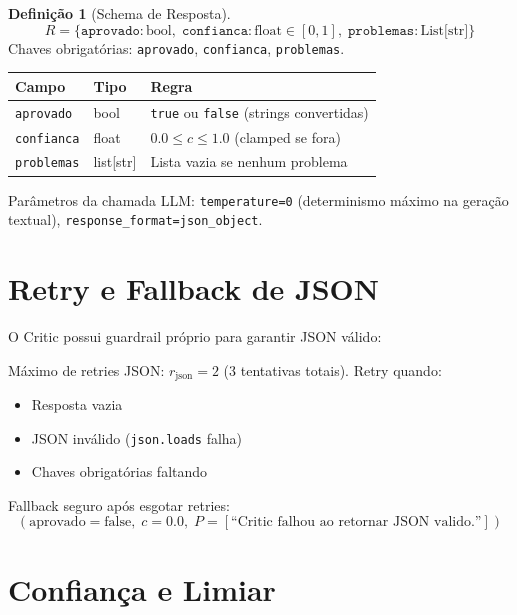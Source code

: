 \documentclass[a4paper, 12pt]{report}
\theoremstyle{definition}
\newtheorem{definicao}{Defini\c{c}\~ao}[chapter]
\theoremstyle{remark}
\begin{document}
\begin{definicao}[Schema de Resposta]
  \[
    R = \{
      \texttt{aprovado}: \text{bool},\;
      \texttt{confianca}: \text{float} \in [0, 1],\;
      \texttt{problemas}: \text{List[str]}
    \}
  \]
  Chaves obrigat\'orias: \texttt{aprovado}, \texttt{confianca}, \texttt{problemas}.
\end{definicao}

\begin{center}
\begin{tabular}{lll}
  \toprule
  \textbf{Campo} & \textbf{Tipo} & \textbf{Regra} \\
  \midrule
  \texttt{aprovado} & bool & \texttt{true} ou \texttt{false} (strings convertidas) \\
  \texttt{confianca} & float & $0.0 \leq c \leq 1.0$ (clamped se fora) \\
  \texttt{problemas} & list[str] & Lista vazia se nenhum problema \\
  \bottomrule
\end{tabular}
\end{center}

Par\^ametros da chamada LLM: \texttt{temperature=0} (determinismo m\'aximo
na gera\c{c}\~ao textual), \texttt{response\_format=json\_object}.


\section{Retry e Fallback de JSON}

O Critic possui guardrail pr\'oprio para garantir JSON v\'alido:

\begin{caixaguardrail}
  M\'aximo de retries JSON: $r_{\text{json}} = 2$ (3 tentativas totais).
  Retry quando:
  \begin{itemize}
    \item Resposta vazia
    \item JSON inv\'alido (\texttt{json.loads} falha)
    \item Chaves obrigat\'orias faltando
  \end{itemize}
  Fallback seguro ap\'os esgotar retries:
  \[
    (\text{aprovado}=\text{false},\; c=0.0,\;
    P=[\text{``Critic falhou ao retornar JSON valido.''}])
  \]
\end{caixaguardrail}


\section{Confian\c{c}a e Limiar}
\end{document}
